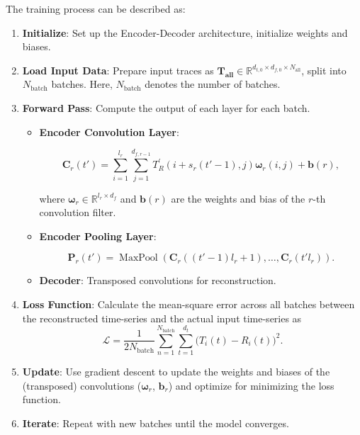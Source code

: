 \documentclass{ieeetmlcn}
\begin{document}
The training process can be described as:
\begin{enumerate}
    \item \textbf{Initialize}: Set up the Encoder-Decoder architecture, initialize weights and biases.
    \item \textbf{Load Input Data}: Prepare input traces as $\mathbf{T_{\text{all}}} \in \mathbb{R}^{ d_{t,0} \times d_{f,0} \times N_{\text{all}}}$, split into $N_{\text{batch}}$ batches. Here, $N_{\text{batch}}$ denotes the number of batches.
    \item \textbf{Forward Pass}: Compute the output of each layer for each batch.
    
    \begin{itemize}
        \item \textbf{Encoder Convolution Layer}:
        \begin{footnotesize}
        \begin{equation}
        \boldsymbol{C}_r(t') = \sum_{i=1}^{l_r} \sum_{j=1}^{d_{f, r-1}} T^{'}_R(i+s_r(t'-1), j) \boldsymbol{\omega}_r(i, j) + \boldsymbol{b}(r),
        \end{equation}
        \end{footnotesize}
        where $\boldsymbol{\omega}_r \in \mathbb{R}^{l_r \times d_f}$ and $\boldsymbol{b}(r)$ are the weights and bias of the $r$-th convolution filter.
        
        \item \textbf{Encoder Pooling Layer}:
        \begin{footnotesize}
        \begin{equation}
        \boldsymbol{P}_r(t') = \operatorname{MaxPool}\left(\boldsymbol{C}_r((t'-1)l_r+1), \ldots, \boldsymbol{C}_r(t' l_r)\right).
        \end{equation}
        \end{footnotesize}
        \item \textbf{Decoder}: Transposed convolutions for reconstruction.
    \end{itemize}
    \item \textbf{Loss Function}: Calculate the mean-square error across all batches between the reconstructed time-series and the actual input time-series as
    \begin{equation}
    \mathcal{L} = \frac{1}{2N_{\text{batch}}} \sum_{n=1}^{N_{\text{batch}}} \sum_{t=1}^{d_t} \Big(T_i(t) - R_i(t) \Big)^2.
    \end{equation}
    \item \textbf{Update}: Use gradient descent to update the weights and biases of the (transposed) convolutions ($\boldsymbol{\omega}_r$, $\boldsymbol{b}_r$) and optimize for minimizing the loss function.
    \item \textbf{Iterate}: Repeat with new batches until the model converges.
\end{enumerate}
\end{document}
